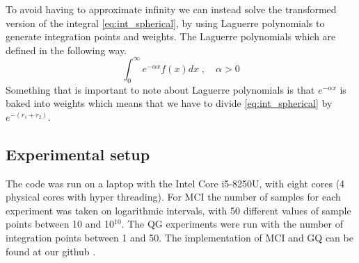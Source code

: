 To avoid having to approximate infinity we can instead solve the
transformed version of the integral \cref{eq:int_spherical}, by using Laguerre
polynomials to generate integration points and weights. The Laguerre polynomials
which are defined in the following way.
\begin{equation}\label{eq:laguerre}
  \int_0^{\infty} e^{-\alpha x} f(x)dx \; , \quad \alpha > 0
\end{equation}
Something that is important to note about Laguerre polynomials is that
$e^{-\alpha x}$ is baked into weights which means that we have to divide
\cref{eq:int_spherical} by $e^{-(r_1 + r_2)}$.



\subsection{Experimental setup}

The code was run on a laptop with the Intel Core i5-8250U, with eight cores
(4 physical cores with hyper threading). For MCI
the number of samples for each experiment was taken on logarithmic intervals,
with 50 different values of sample points between 10 and 10$^{10}$. The QG
experiments were run with the number of integration points between 1 and 50.
The implementation of MCI and GQ can be found at our github \parencite{github}.
